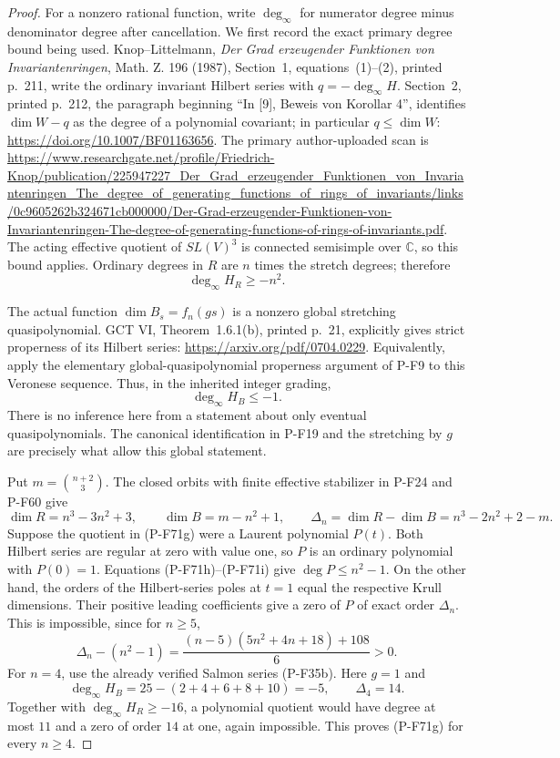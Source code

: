 \begin{proof}
For a nonzero rational function, write $\deg_\infty$
for numerator degree minus denominator degree after
cancellation.  We first record the exact primary degree
bound being used.  Knop--Littelmann,
\emph{Der Grad erzeugender Funktionen von Invariantenringen},
Math. Z. 196 (1987), Section~1, equations~(1)--(2),
printed p.~211, write the ordinary invariant Hilbert
series with $q=-\deg_\infty H$.
Section~2, printed p.~212, the paragraph beginning
``In [9], Beweis von Korollar 4'', identifies
$\dim W-q$ as the degree of a polynomial covariant;
in particular $q\le\dim W$:
\url{https://doi.org/10.1007/BF01163656}.
The primary author-uploaded scan is
\url{https://www.researchgate.net/profile/Friedrich-Knop/publication/225947227_Der_Grad_erzeugender_Funktionen_von_Invariantenringen_The_degree_of_generating_functions_of_rings_of_invariants/links/0c9605262b324671cb000000/Der-Grad-erzeugender-Funktionen-von-Invariantenringen-The-degree-of-generating-functions-of-rings-of-invariants.pdf}.
The acting effective quotient of $SL(V)^3$ is connected
semisimple over $\mathbb C$, so this bound applies.
Ordinary degrees in $R$ are $n$ times the stretch degrees;
therefore
\[
                        \deg_\infty H_R\ge-n^2.                \tag{P-F71h}
\]

The actual function $\dim B_s=f_n(gs)$ is a nonzero
global stretching quasipolynomial.  GCT VI,
Theorem~1.6.1(b), printed p.~21, explicitly gives strict
properness of its Hilbert series:
\url{https://arxiv.org/pdf/0704.0229}.
Equivalently, apply the elementary global-quasipolynomial
properness argument of P-F9 to this Veronese sequence.
Thus, in the inherited integer grading,
\[
                        \deg_\infty H_B\le-1.                 \tag{P-F71i}
\]
There is no inference here from a statement about only
eventual quasipolynomials.  The canonical identification
in P-F19 and the stretching by $g$ are precisely what
allow this global statement.

Put $m=\binom{n+2}{3}$.  The closed orbits with finite
effective stabilizer in P-F24 and P-F60 give
\[
 \dim R=n^3-3n^2+3,\qquad
 \dim B=m-n^2+1,
 \qquad
 \Delta_n=\dim R-\dim B=n^3-2n^2+2-m.                          \tag{P-F71j}
\]
Suppose the quotient in (P-F71g) were a Laurent
polynomial $P(t)$.  Both Hilbert series are regular
at zero with value one, so $P$ is an ordinary polynomial
with $P(0)=1$.  Equations (P-F71h)--(P-F71i) give
$\deg P\le n^2-1$.  On the other hand, the orders of
the Hilbert-series poles at $t=1$ equal the respective
Krull dimensions.  Their positive leading coefficients
give a zero of $P$ of exact order $\Delta_n$.
This is impossible, since for $n\ge5$,
\[
 \Delta_n-(n^2-1)
  =\frac{(n-5)(5n^2+4n+18)+108}{6}>0.                          \tag{P-F71k}
\]
For $n=4$, use the already verified Salmon series
(P-F35b).  Here $g=1$ and
\[
 \deg_\infty H_B=25-(2+4+6+8+10)=-5,
 \qquad \Delta_4=14.
                                                               \tag{P-F71l}
\]
Together with $\deg_\infty H_R\ge-16$, a polynomial
quotient would have degree at most $11$ and a zero of
order $14$ at one, again impossible.  This proves
(P-F71g) for every $n\ge4$.


\end{proof}
